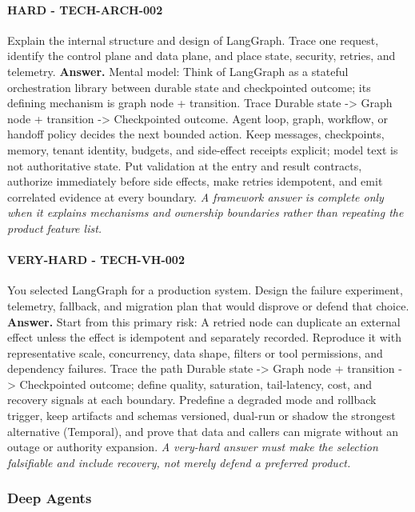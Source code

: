 \paragraph{HARD - TECH-ARCH-002} Explain the internal structure and design of LangGraph. Trace one request, identify the control plane and data plane, and place state, security, retries, and telemetry.
\textbf{Answer.} Mental model: Think of LangGraph as a stateful orchestration library between durable state and checkpointed outcome; its defining mechanism is graph node + transition. Trace Durable state -> Graph node + transition -> Checkpointed outcome. Agent loop, graph, workflow, or handoff policy decides the next bounded action. Keep messages, checkpoints, memory, tenant identity, budgets, and side-effect receipts explicit; model text is not authoritative state. Put validation at the entry and result contracts, authorize immediately before side effects, make retries idempotent, and emit correlated evidence at every boundary.
\textit{A framework answer is complete only when it explains mechanisms and ownership boundaries rather than repeating the product feature list.}
\paragraph{VERY-HARD - TECH-VH-002} You selected LangGraph for a production system. Design the failure experiment, telemetry, fallback, and migration plan that would disprove or defend that choice.
\textbf{Answer.} Start from this primary risk: A retried node can duplicate an external effect unless the effect is idempotent and separately recorded. Reproduce it with representative scale, concurrency, data shape, filters or tool permissions, and dependency failures. Trace the path Durable state -> Graph node + transition -> Checkpointed outcome; define quality, saturation, tail-latency, cost, and recovery signals at each boundary. Predefine a degraded mode and rollback trigger, keep artifacts and schemas versioned, dual-run or shadow the strongest alternative (Temporal), and prove that data and callers can migrate without an outage or authority expansion.
\textit{A very-hard answer must make the selection falsifiable and include recovery, not merely defend a preferred product.}
\subsubsection*{Deep Agents}
